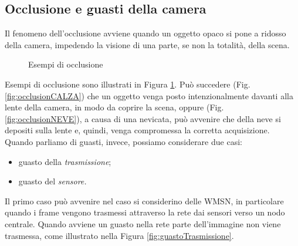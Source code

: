 \subsection{Occlusione e guasti della camera}
Il fenomeno dell'occlusione avviene quando un oggetto opaco si pone a ridosso della camera, impedendo la visione di una parte, se non la totalit\`a, della scena. 
\begin{figure}[tb]
	\centering
	\caption{Esempi di occlusione}
	\label{fig:occlusion}
\end{figure}
\noindent Esempi di occlusione sono illustrati in Figura \ref{fig:occlusion}. 
Pu\`o succedere (Fig. \ref{fig:occlusionCALZA}) che un oggetto venga posto intenzionalmente davanti alla lente della camera, in modo da coprire la scena, oppure (Fig. \ref{fig:occlusionNEVE}), a causa di una nevicata, pu\`o avvenire che della neve si depositi sulla lente e, quindi, venga compromessa la corretta acquisizione.\\
Quando parliamo di guasti, invece, possiamo considerare due casi:
\begin{itemize}
	\item guasto della \textit{trasmissione};
	\item guasto del \textit{sensore.}
\end{itemize}
Il primo caso pu\`o avvenire nel caso si considerino delle WMSN, in particolare quando i frame vengono trasmessi attraverso la rete dai sensori verso un nodo centrale.
Quando avviene un guasto nella rete parte dell'immagine non viene trasmessa, come illustrato nella Figura \ref{fig:guastoTrasmissione}.
